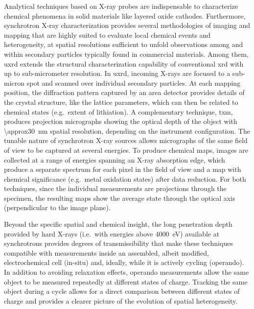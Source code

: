 \documentclass{WileyMSP-template}
\begin{document}
Analytical techniques based on X-ray probes are indispensable to
characterize chemical phenomena in solid materials like layered oxide
cathodes\cite{doeff2017}. Furthermore, synchrotron X-ray
characterization provides several methodologies of imaging and mapping
that are highly suited to evaluate local chemical events and
heterogeneity\cite{wolf2017}, at spatial resolutions sufficient to
unfold observations among and within secondary particles typically
found in commercial materials. Among them, \gls{uxrd} extends the
structural characterization capability of conventional \gls{xrd} with
up to sub-micrometer resolution. In \gls{uxrd}, incoming X-rays are
focused to a sub-micron spot and scanned over individual secondary
particles. At each mapping position, the diffraction pattern captured
by an area detector provides details of the crystal structure, like
the lattice parameters, which can then be related to chemical states
(e.g.\ extent of lithiation). A complementary technique, \Gls{txm},
produces projection micrographs showing the optical depth of the
object with \SI{\approx30}{nm} spatial resolution, depending on the
instrument configuration. The tunable nature of synchrotron X-ray
sources allows micrographs of the same field of view to be captured at
several energies. To produce chemical maps, images are collected at a
range of energies spanning an X-ray absorption edge, which produce a
separate spectrum for each pixel in the field of view and a map with
chemical significance (e.g.\ metal oxidation states) after data
reduction. For both techniques, since the individual measurements are
projections through the specimen, the resulting maps show the average
state through the optical axis (perpendicular to the image plane).

Beyond the specific spatial and chemical insight, the long penetration
depth provided by hard X-rays (i.e.\ with energies above
\SI{4000}{\electronvolt}) available at synchrotrons provides degrees
of transmissibility that make these techniques compatible with
measurements inside an assembled, albeit modified, electrochemical
cell (in-situ) and, ideally, while it is actively cycling
(operando). In addition to avoiding relaxation effects, operando
measurements allow the same object to be measured repeatedly at
different states of charge. Tracking the same object during a cycle
allows for a direct comparison between different states of charge and
provides a clearer picture of the evolution of spatial heterogeneity.

\end{document}
